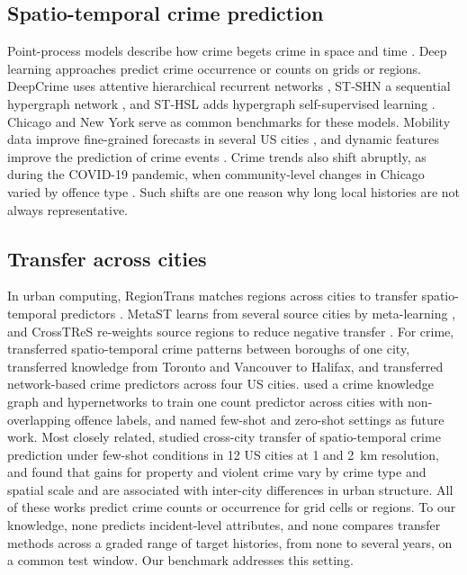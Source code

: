 \documentclass[11pt]{article}
\begin{document}
\subsection{Spatio-temporal crime prediction}
Point-process models describe how crime begets crime in space and time \citep{mohler2011}. Deep learning approaches predict crime occurrence or counts on grids or regions. DeepCrime uses attentive hierarchical recurrent networks \citep{huang2018deepcrime}, ST-SHN a sequential hypergraph network \citep{xia2021stshn}, and ST-HSL adds hypergraph self-supervised learning \citep{li2022sthsl}. Chicago and New York serve as common benchmarks for these models. Mobility data improve fine-grained forecasts in several US cities \citep{alborszumel2026}, and dynamic features improve the prediction of crime events \citep{rumi2018}. Crime trends also shift abruptly, as during the COVID-19 pandemic, when community-level changes in Chicago varied by offence type \citep{campedelli2020}. Such shifts are one reason why long local histories are not always representative.

\subsection{Transfer across cities}
In urban computing, RegionTrans matches regions across cities to transfer spatio-temporal predictors \citep{wang2019regiontrans}. MetaST learns from several source cities by meta-learning \citep{yao2019metast}, and CrossTReS re-weights source regions to reduce negative transfer \citep{jin2022crosstres}. For crime, \citet{zhao2017transfer} transferred spatio-temporal crime patterns between boroughs of one city, \citet{bappee2021} transferred knowledge from Toronto and Vancouver to Halifax, and \citet{wu2024transfer} transferred network-based crime predictors across four US cities. \citet{karimova2025} used a crime knowledge graph and hypernetworks to train one count predictor across cities with non-overlapping offence labels, and named few-shot and zero-shot settings as future work. Most closely related, \citet{shan2026} studied cross-city transfer of spatio-temporal crime prediction under few-shot conditions in 12 US cities at 1 and 2~km resolution, and found that gains for property and violent crime vary by crime type and spatial scale and are associated with inter-city differences in urban structure. All of these works predict crime counts or occurrence for grid cells or regions. To our knowledge, none predicts incident-level attributes, and none compares transfer methods across a graded range of target histories, from none to several years, on a common test window. Our benchmark addresses this setting.
\end{document}
